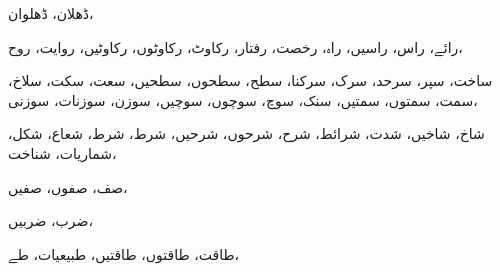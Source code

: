                                                                                                 ڈھلان،            ڈھلوان،
                                                                                                
                                                                                                            رائے،            راس،            راسیں،            راہ،            رخصت،            رفتار،            رکاوٹ،            رکاوٹوں،            رکاوٹیں،            روایت،            روح،
                                                                                                            
                                                                                                                        ساخت،            سپر،            سرحد،            سرک،            سرکنا،            سطح،            سطحوں،            سطحیں،            سعت،            سکت،            سلاخ،            سمت،            سمتوں،            سمتیں،            سنک،            سوچ،            سوچوں،            سوچیں،            سوزن،            سوزنات،            سوزنی،
                                                                                                                        
                                                                                                                                    شاخ،            شاخیں،            شدت،            شرائط،            شرح،            شرحوں،            شرحیں،            شرط،            شرط،            شعاع،            شکل،            شماریات،            شناخت،
                                                                                                                                    
                                                                                                                                                صف،            صفوں،            صفیں،
                                                                                                                                                
                                                                                                                                                            ضرب،            ضربیں،
                                                                                                                                                            
                                                                                                                                                                        طاقت،            طاقتوں،            طاقتیں،            طبیعیات،            طے،
                                                                                                                                                                        
